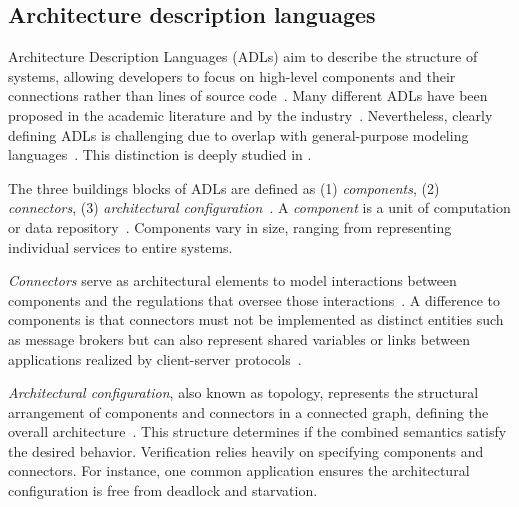 \documentclass[runningheads]{llncs}
\begin{document}
\subsection{Architecture description languages} \label{subsec: adl}
Architecture Description Languages (ADLs) aim to describe the structure of systems, allowing developers to focus on high-level components and their connections rather than lines of source code~\cite{clementsSurveyArchitectureDescription1996,medvidovicClassificationComparisonFramework2000,medvidovicFrameworkClassifyingComparing1997}.
Many different ADLs have been proposed in the academic literature and by the industry~\cite{medvidovicClassificationComparisonFramework2000,woodsArchitectureDescriptionLanguages2005}.
Nevertheless, clearly defining ADLs is challenging due to overlap with general-purpose modeling languages~\cite{clementsSurveyArchitectureDescription1996}.
This distinction is deeply studied in \cite{medvidovicClassificationComparisonFramework2000}.

The three buildings blocks of ADLs are defined as (1) \textit{components}, (2) \textit{connectors}, (3) \textit{architectural configuration}~\cite{medvidovicClassificationComparisonFramework2000,medvidovicFrameworkClassifyingComparing1997}.
A \textit{component} is a unit of computation or data repository~\cite{medvidovicClassificationComparisonFramework2000}.
Components vary in size, ranging from representing individual services to entire systems.

\textit{Connectors} serve as architectural elements to model interactions between components and the regulations that oversee those interactions~\cite{medvidovicClassificationComparisonFramework2000}.
A difference to components is that connectors must not be implemented as distinct entities such as message brokers but can also represent shared variables or links between applications realized by client-server protocols~\cite{medvidovicClassificationComparisonFramework2000}.

\textit{Architectural configuration}, also known as topology, represents the structural arrangement of components and connectors in a connected graph, defining the overall architecture~\cite{medvidovicClassificationComparisonFramework2000}.
This structure determines if the combined semantics satisfy the desired behavior.
Verification relies heavily on specifying components and connectors.
For instance, one common application ensures the architectural configuration is free from deadlock and starvation.
\end{document}
